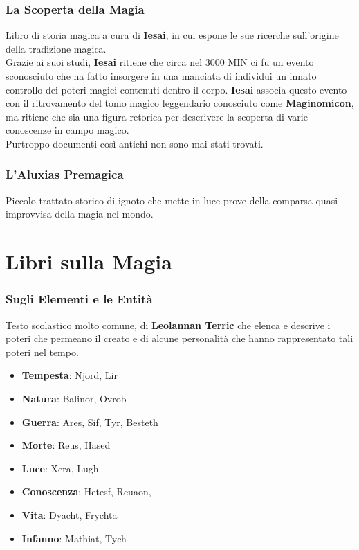 \documentclass[10pt,twoside,onecolumn,openany]{book}
\begin{document}
\subsubsection{La Scoperta della Magia}
Libro di storia magica a cura di \textbf{Iesai}, in cui espone le sue ricerche sull'origine della tradizione magica.\\
Grazie ai suoi studi, \textbf{Iesai} ritiene che circa nel 3000 MIN ci fu un evento sconosciuto che ha fatto insorgere in una manciata di individui un innato controllo dei poteri magici contenuti dentro il corpo. \textbf{Iesai} associa questo evento con il ritrovamento del tomo magico leggendario conosciuto come \textbf{Maginomicon}, ma ritiene che sia una figura retorica per descrivere la scoperta di varie conoscenze in campo magico.\\
Purtroppo documenti così antichi non sono mai stati trovati.
\subsubsection{L'Aluxias Premagica} Piccolo trattato storico di ignoto che mette in luce prove della comparsa quasi improvvisa della magia nel mondo.
\section{Libri sulla Magia}
\subsubsection{Sugli Elementi e le Entità} Testo scolastico molto comune, di \textbf{Leolannan Terric} che elenca e descrive i poteri che permeano il creato e di alcune personalità che hanno rappresentato tali poteri nel tempo.
\begin{multicols}{2}
\begin{itemize}
\item \textbf{Tempesta}: Njord, Lir
\item \textbf{Natura}: Balinor, Ovrob
\item \textbf{Guerra}: Ares, Sif, Tyr, Besteth
\item \textbf{Morte}: Reus, Hased
\item \textbf{Luce}: Xera, Lugh
\item \textbf{Conoscenza}: Hetesf, Reuaon,
\item \textbf{Vita}: Dyacht, Frychta
\item \textbf{Infanno}: Mathiat, Tych
\end{itemize}
\end{multicols}
\end{document}
